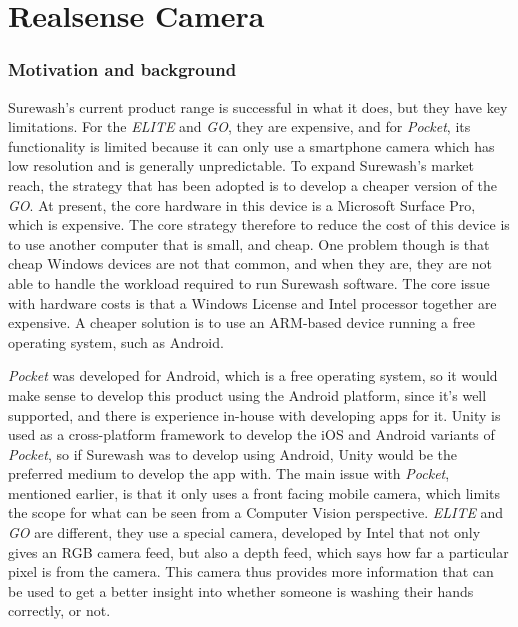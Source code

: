 \part{Realsense Camera}
\label{part:rscam}
\section{Motivation and background}
Surewash's current product range is successful in what it does, but they have key limitations. For the {\slshape ELITE} and {\slshape GO}, they are expensive, and for {\slshape Pocket}, its functionality is limited because it can only use a smartphone camera which has low resolution and is generally unpredictable. To expand Surewash's market reach, the strategy that has been adopted is to develop a cheaper version of the {\slshape GO}. At present, the core hardware in this device is a Microsoft Surface Pro, which is expensive. The core strategy therefore to reduce the cost of this device is to use another computer that is small, and cheap. One problem though is that cheap Windows devices are not that common, and when they are, they are not able to handle the workload required to run Surewash software. The core issue with hardware costs is that a Windows License and Intel processor together are expensive. A cheaper solution is to use an ARM-based device running a free operating system, such as Android.

{\slshape Pocket} was developed for Android, which is a free operating system, so it would make sense to develop this product using the Android platform, since it's well supported, and there is experience in-house with developing apps for it. Unity is used as a cross-platform framework to develop the iOS and Android variants of {\slshape Pocket}, so if Surewash was to develop using Android, Unity would be the preferred medium to develop the app with. The main issue with {\slshape Pocket}, mentioned earlier, is that it only uses a front facing mobile camera, which limits the scope for what can be seen from a Computer Vision perspective. {\slshape ELITE} and {\slshape GO} are different, they use a special camera, developed by Intel that not only gives an RGB camera feed, but also a depth feed, which says how far a particular pixel is from the camera. This camera thus provides more information that can be used to get a better insight into whether someone is washing their hands correctly, or not.

